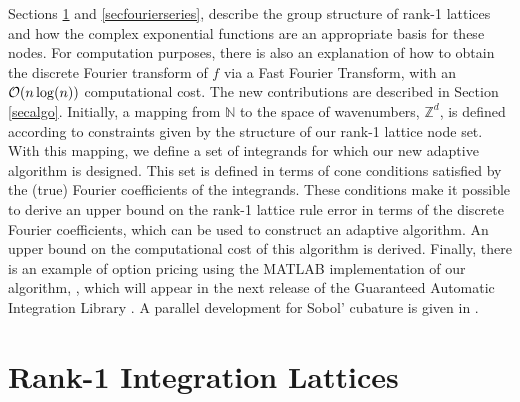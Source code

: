 \documentclass[graybox]{svmult}
\newcommand{\Z}{\mathbb{Z}} %
\newcommand{\N}{\mathbb{N}} %
\begin{document}
Sections \ref{secrank1lat} and \ref{secfourierseries}, describe the group structure of rank-1 lattices and how the complex exponential functions are an appropriate basis for these nodes. For computation purposes, there is also an explanation of how to obtain the discrete Fourier transform of $f$ via a Fast Fourier Transform, with an $\mathcal{O}(n \log(n))$ computational cost.  The new contributions are described in Section \ref{secalgo}. Initially, a mapping from $\N$ to the space of wavenumbers, $\Z^d$, is defined according to constraints given by the structure of our rank-1 lattice node set. With this mapping, we define a set of integrands for which our new adaptive algorithm is designed.  This set is defined in terms of cone conditions satisfied by the (true) Fourier coefficients of the integrands. These conditions make it possible to derive an upper bound on the rank-1 lattice rule error in terms of the discrete Fourier coefficients, which can be used to construct an adaptive algorithm.  An upper bound on the computational cost of this algorithm is derived. Finally, there is an example of option pricing using the MATLAB implementation of our algorithm, \cublat, which will appear in the next release of the Guaranteed Automatic Integration Library \cite{ChoEtal14a}.  A parallel development for Sobol' cubature is given in \cite{HicJim16a}.

\section{Rank-1 Integration Lattices}\label{secrank1lat}
\end{document}
